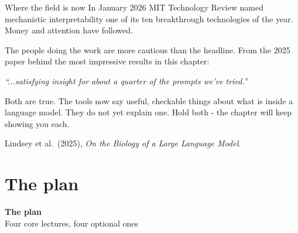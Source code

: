 \documentclass[aspectratio=169]{beamer}
\newcommand{\takebox}[1]{%
  \begin{tcolorbox}[colback=paramgreen!8, colframe=paramgreen, boxrule=0.6pt, arc=2pt]
  #1
  \end{tcolorbox}}
\newcommand{\promptbox}[1]{%
  \begin{center}
  \begin{tcolorbox}[colback=lightbg, colframe=gray, boxrule=0.5pt, arc=2pt, width=0.88\textwidth]
    \centering\textit{#1}
  \end{tcolorbox}
  \end{center}}
\newcommand{\sectiontransition}[2]{%
  \begin{frame}[plain]
    \vfill
    \begin{center}
      {\Huge\bfseries\color{popblue} #1}\\[1.1em]
      {\large #2}
    \end{center}
    \vfill
  \end{frame}}
\begin{document}
\begin{frame}{Where the field is now}
  \vspace{0.6em}
  In January 2026 MIT Technology Review named mechanistic interpretability one of its ten
  breakthrough technologies of the year. Money and attention have followed.

  \vspace{0.8em}
  The people doing the work are more cautious than the headline. From the 2025 paper behind the
  most impressive results in this chapter:

  \vspace{0.5em}
  \promptbox{``...satisfying insight for about a quarter of the prompts we've tried.''}

  \vspace{0.5em}
  \takebox{Both are true. The tools now say useful, checkable things about what is inside a
  language model. They do not yet explain one. Hold both - the chapter will keep showing you
  each.}

  \vspace{0.3em}
  {\footnotesize Lindsey et al.\ (2025), \emph{On the Biology of a Large Language Model}.}
\end{frame}

\section{The plan}
\sectiontransition{The plan}{Four core lectures, four optional ones}
\end{document}
